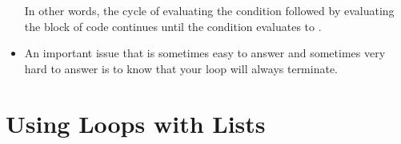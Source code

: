 \documentclass[letterpaper,10pt,english]{sphinxmanual}
\begin{document}
\begin{itemize}
\begin{enumerate}
\begin{enumerate}
\end{enumerate}

\end{enumerate}

In other words, the cycle of evaluating the condition followed by
evaluating the block of code continues until the condition evaluates
to .

\item {} 
An important issue that is sometimes easy to answer and sometimes
very hard to answer is to know that your loop will always
terminate.

\end{itemize}


\section{Using Loops with Lists}
\end{document}
